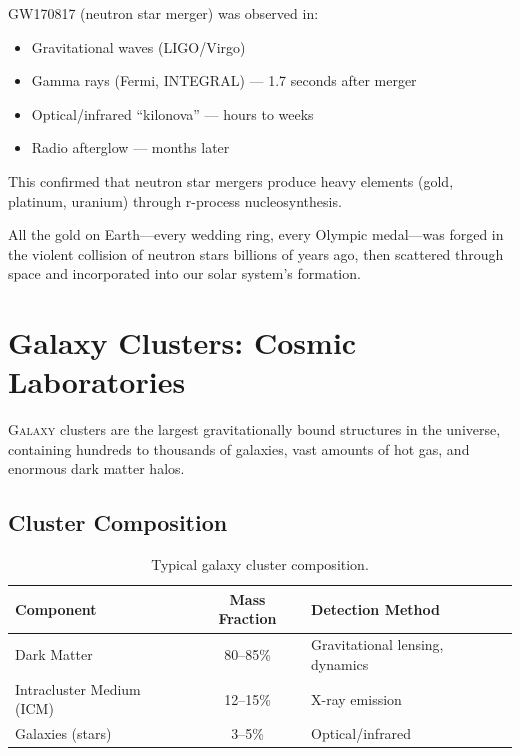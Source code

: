 \documentclass[11pt,a4paper]{article}
\begin{document}
GW170817 (neutron star merger) was observed in:
\begin{itemize}[noitemsep]
    \item Gravitational waves (LIGO/Virgo)
    \item Gamma rays (Fermi, INTEGRAL) --- 1.7 seconds after merger
    \item Optical/infrared ``kilonova'' --- hours to weeks
    \item Radio afterglow --- months later
\end{itemize}

This confirmed that neutron star mergers produce heavy elements (gold, platinum, uranium) through r-process nucleosynthesis.

\begin{funfactbox}
All the gold on Earth---every wedding ring, every Olympic medal---was forged in the violent collision of neutron stars billions of years ago, then scattered through space and incorporated into our solar system's formation.
\end{funfactbox}

\newpage

\section{Galaxy Clusters: Cosmic Laboratories}
\label{sec:clusters}

\lettrine[lines=3, loversize=0.1, nindent=0.5em]{G}{alaxy} clusters are the largest gravitationally bound structures in the universe, containing hundreds to thousands of galaxies, vast amounts of hot gas, and enormous dark matter halos.

\subsection{Cluster Composition}

\begin{table}[H]
\centering
\caption{Typical galaxy cluster composition.}
\label{tab:cluster_composition}
\begin{tabular}{|l|c|l|}
\hline
\textbf{Component} & \textbf{Mass Fraction} & \textbf{Detection Method} \\
\hline
Dark Matter & 80--85\% & Gravitational lensing, dynamics \\
Intracluster Medium (ICM) & 12--15\% & X-ray emission \\
Galaxies (stars) & 3--5\% & Optical/infrared \\
\hline
\end{tabular}
\end{table}
\end{document}
